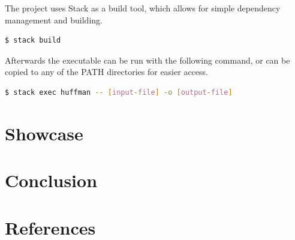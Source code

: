 \documentclass{article}
\begin{document}
The project uses Stack as a build tool, which allows for simple dependency management and building.

\begin{lstlisting}[language=bash]
$ stack build
\end{lstlisting}

Afterwards the executable can be run with the following command, or can be copied to any of the PATH directories for easier access.

\begin{lstlisting}[language=bash]
$ stack exec huffman -- [input-file] -o [output-file]
\end{lstlisting}

\section{Showcase}

\section{Conclusion}

\section{References}
\end{document}
